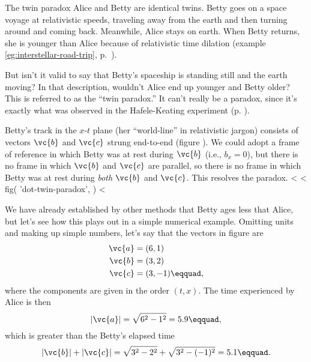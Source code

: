 \begin{eg}{The twin paradox}\label{eg:dot-twin-paradox}
Alice and Betty are identical twins. Betty goes on a space voyage at relativistic speeds, traveling away from the
earth and then turning around and coming back. Meanwhile, Alice stays on earth. When Betty returns, she is younger
than Alice because of relativistic time dilation 
(example \ref{eg:interstellar-road-trip}, p.~\pageref{eg:interstellar-road-trip}). 

But
isn't it valid to say that Betty's spaceship is standing still
and the earth moving? In that description, wouldn't Alice end up younger and Betty older?
This is referred to as the
``twin paradox.'' It can't really be a paradox, since it's exactly what was observed in the
Hafele-Keating experiment (p. \pageref{hafele-keating-discussed}).

Betty's track in the $x$-$t$ plane
(her ``world-line'' in relativistic jargon)
consists of vectors $\vc{b}$ and $\vc{c}$ strung end-to-end
(figure ).
We could adopt a frame of reference in which Betty was at rest during $\vc{b}$ (i.e., $b_x=0$), but there
is no frame in which $\vc{b}$ and $\vc{c}$ are parallel, so there is no frame in which Betty was at rest
during \emph{both} $\vc{b}$ and $\vc{c}$. This resolves the paradox.
<%
<%
  fig(
    'dot-twin-paradox',
  )
<%

We have already established by other methods that Betty ages less that Alice, but let's see how this plays
out in a simple numerical example. Omitting units and making up simple numbers, let's say that the vectors
in figure  are
\begin{align*}
  \vc{a} &= (6,1) \\
  \vc{b} &= (3,2) \\
  \vc{c} &= (3,-1)\eqquad,
\end{align*}
where the components are given in the order $(t,x)$. The time experienced by Alice is then
\begin{equation*}
  |\vc{a}| = \sqrt{6^2-1^2} =5.9\eqquad,
\end{equation*}
which is greater than the Betty's elapsed time
\begin{equation*}
  |\vc{b}|+|\vc{c}| = \sqrt{3^2-2^2}+\sqrt{3^2-(-1)^2} = 5.1\eqquad.
\end{equation*}


\end{eg}

